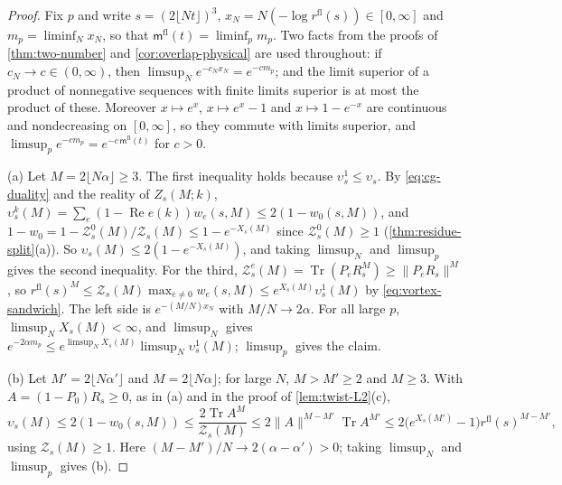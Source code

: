 \documentclass[11pt,a4paper]{amsart}
\theoremstyle{definition}
\theoremstyle{remark}
\numberwithin{equation}{section}
\DeclareMathOperator{\Tr}{Tr}        %
\newcommand{\norm}[1]{\lVert #1\rVert}     %
\newcommand{\TT}{\mathbb{T}}               %
\newcommand{\Zc}{\mathcal{Z}}              %
\newcommand{\Zs}[2]{\Zc_{#1}(#2)}          %
\newcommand{\XT}[2]{X_{#1}(#2)}            %
\newcommand{\cube}[1]{(2#1)^3}             %
\begin{document}
\begin{proof}
Fix $p$ and write $s=\cube{\lfloor Nt\rfloor}$, $x_N=N(-\log r^{\mathrm{fl}}(s))\in[0,\infty]$ and $m_p=\liminf_Nx_N$, so that $\mathsf m^{\mathrm{fl}}(t)=\liminf_pm_p$. Two facts from the proofs of \cref{thm:two-number} and \cref{cor:overlap-physical} are used throughout: if $c_N\to c\in(0,\infty)$, then $\limsup_Ne^{-c_Nx_N}=e^{-cm_p}$; and the limit superior of a product of nonnegative sequences with finite limits superior is at most the product of these. Moreover $x\mapsto e^x$, $x\mapsto e^x-1$ and $x\mapsto1-e^{-x}$ are continuous and nondecreasing on $[0,\infty]$, so they commute with limits superior, and $\limsup_pe^{-cm_p}=e^{-c\,\mathsf m^{\mathrm{fl}}(t)}$ for $c>0$.

(a) Let $M=2\lfloor N\alpha\rfloor\ge3$. The first inequality holds because $\upsilon^1_s\le\upsilon_s$. By \eqref{eq:cg-duality} and the reality of $Z_s(M;k)$, $\upsilon^k_s(M)=\sum_e(1-\operatorname{Re}e(k))w_e(s,M)\le2(1-w_0(s,M))$, and $1-w_0=1-\Zc^0_s(M)/\Zs{s}{M}\le1-e^{-\XT{s}{M}}$ since $\Zc^0_s(M)\ge1$ (\cref{thm:residue-split}\textup{(a)}). So $\upsilon_s(M)\le2(1-e^{-\XT{s}{M}})$, and taking $\limsup_N$ and $\limsup_p$ gives the second inequality. For the third, $\Zc^e_s(M)=\Tr(P_eR_s^M)\ge\norm{P_eR_s}^M$, so $r^{\mathrm{fl}}(s)^M\le\Zs{s}{M}\max_{e\ne0}w_e(s,M)\le e^{\XT{s}{M}}\upsilon^1_s(M)$ by \eqref{eq:vortex-sandwich}. The left side is $e^{-(M/N)x_N}$ with $M/N\to2\alpha$. For all large $p$, $\limsup_N\XT{s}{M}<\infty$, and $\limsup_N$ gives $e^{-2\alpha m_p}\le e^{\limsup_N\XT{s}{M}}\limsup_N\upsilon^1_s(M)$; $\limsup_p$ gives the claim.

(b) Let $M'=2\lfloor N\alpha'\rfloor$ and $M=2\lfloor N\alpha\rfloor$; for large $N$, $M>M'\ge2$ and $M\ge3$. With $A=(1-P_0)R_s\ge0$, as in (a) and in the proof of \cref{lem:twist-L2}\textup{(c)},
\[
\upsilon_s(M)\le2(1-w_0(s,M))\le\frac{2\Tr A^M}{\Zs{s}{M}}\le2\norm A^{M-M'}\Tr A^{M'}\le2\bigl(e^{\XT{s}{M'}}-1\bigr)r^{\mathrm{fl}}(s)^{M-M'},
\]
using $\Zs{s}{M}\ge1$. Here $(M-M')/N\to2(\alpha-\alpha')>0$; taking $\limsup_N$ and $\limsup_p$ gives (b).


\end{proof}
\end{document}
